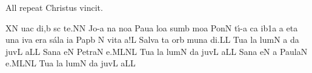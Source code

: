 \bigskip

{\itlyrics All repeat \rm Christus vincit.}

\bigskip

\initiumgregorianum
{}%
\sgn {}{}X\punctum N\egn
{}u\pes ac\egn
\sgn di,\punctum b\egn
\spatium
{}s\punctum c\egn
\sgn te.\punctum N\augmentum N\egn
\spatium
\divisiofinalis
\spatium
\sgn Jo-\punctum a\egn
{}n\punctum a\egn
\sgn no{}\punctum a\egn
\spatium
\sgn P{a}u\punctum a\egn
\sgn lo{}\punctum a\egn
\spatium
\sgn sum\punctum b\egn
\sgn mo{}\punctum a\egn
\spatium
\sgn Pon\punctum N\egn
\sgn t{\'\i}-\punctum a\egn
{}c\punctum a\egn
\sgn {}i{}\episem b1\punctum a\egn
\spatium
\custos a
\lineaproxima
\sgn {}et\punctum a\egn
\spatium
\sgn {}un\punctum a\egn
\sgn {}iv\punctum a\egn
\sgn {}er\punctum a\egn
\sgn s{\'a}l\punctum a\egn
\sgn {}i{}\punctum a\egn
\spatium
\sgn P{a}p\punctum b\egn
\sgn {}{\ae}{}\punctum N\egn
\spatium
\sgn vit\punctum a\egn
\sgn {}a!\engl{~}\punctum L\egn
\spatium
\divisiofinalis
\spatium
\sgn Sa{lv}\punctum a\egn
{}t\punctum a\egn
\sgn {}or\punctum b\egn
\spatium
\sgn m{u}n\punctum a\egn
\sgn di.\punctum L\augmentum L\egn
\spatium
\divisiofinalis
\spatium
\sgn Tu{}\chorus\punctum a\egn
\spatium
{}l\engl{}\punctum a\egn
\sgn lum\punctum N\egn
\spatium
\custos a
\lineaproxima
{}d\punctum a\egn
\sgn juv\punctum L\egn
\sgn {}a{}\punctum L\augmentum L\egn
\spatium
\divisiofinalis
\spatium
\sgn S{a}n\cantores\punctum a\egn
{}e{}\punctum N\egn
\spatium
\sgn P{e}{tr}\clivis aN\egn
\sgn {}e.\clivis ML\augmentumduplex NL\egn
\spatium
\divisiofinalis
\spatium
\sgn Tu{}\chorus\punctum a\egn
\spatium
{}l\punctum a\egn
\sgn lum\punctum N\egn
\spatium
{}d\punctum a\egn
\sgn juv\punctum L\egn
\sgn {}a{}\punctum L\augmentum L\egn
\spatium
\divisiofinalis
\spatium
\sgn S{a}n\cantores\punctum a\egn
{}e{}\punctum N\egn
\spatium
\custos a
\lineaproxima
\sgn P{a}{ul}\clivis aN\egn
\sgn {}e.\clivis ML\augmentumduplex NL\egn
\spatium
\divisiofinalis
\spatium
\sgn Tu{}\chorus\punctum a\egn
\spatium
{}l\punctum a\egn
\sgn lum\punctum N\egn
\spatium
{}d\punctum a\egn
\sgn juv\punctum L\egn
\sgn {}a{}\punctum L\augmentum L\egn
\spatium
\Finisgregoriana

